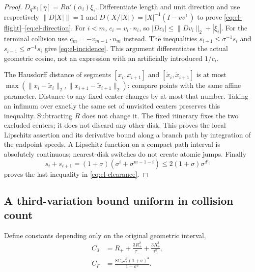 \begin{proof}
$D_qx_i[\eta]=Rn'(\alpha_i)\xi_i$. Differentiate length and unit
direction and use respectively $\|D|X|\|=1$ and
$D(X/|X|)=|X|^{-1}(I-vv^{\mathsf T})$ to prove
\eqref{eq:el-flight}--\eqref{eq:el-direction}. For $i<m$,
$c_i=v_i\cdot n_i$, so $|D c_i|\leq\|Dv_i\|_2+|\xi_i|$.
For the terminal collision use $c_m=-v_{m-1}\cdot n_m$ instead.
The inequalities $s_{i+1}\leq\sigma^{-1}s_i$ and
$s_{i-1}\leq\sigma^{-1}s_i$ give \eqref{eq:el-incidence}.
This argument differentiates the actual geometric cosine, not an
expression with an artificially introduced $1/c_i$.

The Hausdorff distance of segments $[x_i,x_{i+1}]$ and
$[\widetilde x_i,\widetilde x_{i+1}]$ is at most
$\max(\|x_i-\widetilde x_i\|_2,\|x_{i+1}-\widetilde x_{i+1}\|_2)$:
compare points with the same affine parameter. Distance to any fixed
center changes by at most that number. Taking an infimum over exactly
the same set of unvisited centers preserves this inequality. Subtracting
$R$ does not change it. The fixed itinerary fixes the two excluded
centers; it does not discard any other disk. This proves the local
Lipschitz assertion and its derivative bound along a branch path by
integration of the endpoint speeds. A Lipschitz function on a compact
path interval is absolutely continuous; nearest-disk switches do not
create atomic jumps. Finally
\[
 s_i+s_{i+1}=(1+\sigma)(\sigma^i+\sigma^{m-1-i})
             \leq2(1+\sigma)\sigma^{d'_i}
\]
proves the last inequality in \eqref{eq:el-clearance}.
\end{proof}

\subsection{A third-variation bound uniform in collision count}
Define constants depending only on the original geometric interval,
\begin{equation}\label{eq:el-third-constant}
 \begin{split}
 C_3&=R_++\frac{3R_+^2}{\tau_-}+\frac{3R_+^3}{\tau_-^2},\\
 C_F&=\frac{8C_3J_*^3(1+\sigma)^3}{1-\sigma^3}.
 \end{split}
\end{equation}

